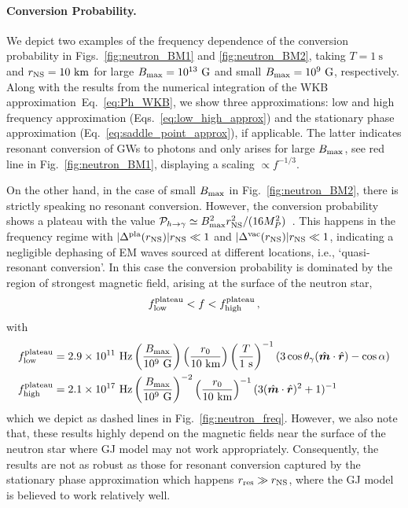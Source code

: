 \documentclass[a4paper,11pt]{article}
\begin{document}
\paragraph{Conversion Probability.} We depict two examples of the frequency dependence of the conversion probability in Figs.~\ref{fig:neutron_BM1} and \ref{fig:neutron_BM2}, taking $ T = 1~\text{s}$ and $ r_{\rm NS} = 10 ~\text{km}$ for large $B_{\rm max} = 10^{13}~\text{G}$ and small $B_{\rm max} = 10^{9}~\text{G}$, respectively.
%
Along with the results from the numerical integration of the WKB approximation~Eq.~\eqref{eq:Ph_WKB}, we show three approximations: low and high frequency approximation (Eqs.~\eqref{eq:low_high_approx}) and the stationary phase approximation (Eq.~\eqref{eq:saddle_point_approx}), if applicable. The latter indicates resonant conversion of GWs to photons and only arises for large $ B_{\rm max} $, see red line in Fig.~\ref{fig:neutron_BM1}, displaying a scaling $ \propto f^{-1/3} $.



On the other hand, in the case of small $ B_{\rm max} $ in Fig.~\ref{fig:neutron_BM2}, there is strictly speaking no resonant conversion. However, the conversion probability shows a plateau with the value $ \mathcal{P}_{h \rightarrow \gamma} \simeq B_{\rm max}^{2} r_{\rm NS}^{2} / (16 M_{P}^{2}) $~\cite{Dandoy:2024oqg}. This happens in the frequency regime with $ \vert \Delta^{\rm pla} (r_{\rm NS}) \vert r_{\rm NS} \ll 1  $ and $ \vert \Delta^{\rm vac} (r_{\rm NS}) \vert r_{\rm NS} \ll 1  $,  indicating a negligible dephasing of EM waves sourced at different locations, i.e., `quasi-resonant conversion'. In this case the conversion probability is dominated by the region of strongest magnetic field, arising at the surface of the neutron star,
%
\begin{align}
       f_{\rm low}^{\rm plateau} < f < f_{\rm high}^{\rm plateau} \,,
\end{align}
with
\begin{equation}
    \begin{aligned}
    f_{\rm low}^{\rm plateau} & = 2.9 \times 10^{11} ~\text{Hz} \left( \frac{B_{\rm max}}{10^{9} ~ \text{G}} \right) \left(  \frac{r_{0}}{10~\text{km}}\right) \left(  \frac{T}{1 ~\text{s}}\right)^{-1} ( 3 \cos \theta_{\gamma} (\hat{\bm{m}} \cdot \hat{\bm{r}}) - \cos \alpha )  \\
     f_{\rm high}^{\rm plateau} & = 2.1 \times 10^{17} ~\text{Hz} \left( \frac{B_{\rm max}}{10^{9} ~ \text{G}} \right)^{-2} \left(  \frac{r_{0}}{10~\text{km}}\right)^{-1} (3 ( \hat{\bm{m}} \cdot \hat{\bm{r}} )^{2} + 1  )^{-1}
\end{aligned}
\end{equation}
%
which we depict as dashed lines in Fig.~\ref{fig:neutron_freq}. However, we also note that, these results highly depend on the magnetic fields near the surface of the neutron star 
where GJ model may not work appropriately.
%
Consequently, the results are not as robust as those for resonant conversion captured by the stationary phase approximation which happens $ r_{\rm res} \gg r_{\rm NS}$, where the GJ model is believed to work relatively well.
%
\end{document}

